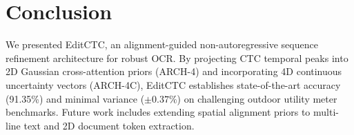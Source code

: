 \section{Conclusion}
\label{sec:conclusion}
We presented EditCTC, an alignment-guided non-autoregressive sequence refinement architecture for robust OCR. By projecting CTC temporal peaks into 2D Gaussian cross-attention priors (ARCH-4) and incorporating 4D continuous uncertainty vectors (ARCH-4C), EditCTC establishes state-of-the-art accuracy (91.35\%) and minimal variance ($\pm 0.37\%$) on challenging outdoor utility meter benchmarks. Future work includes extending spatial alignment priors to multi-line text and 2D document token extraction.
